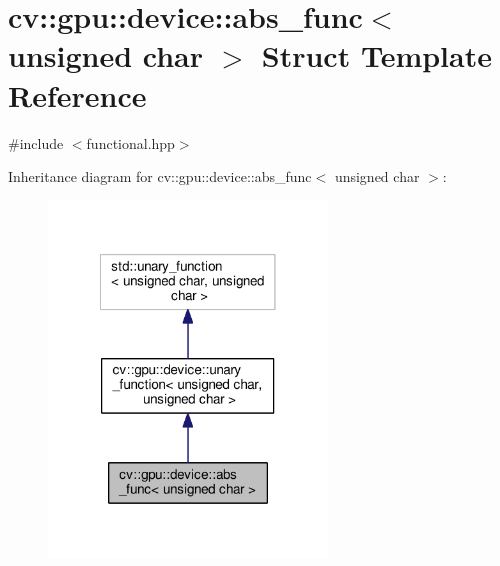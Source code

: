 \hypertarget{structcv_1_1gpu_1_1device_1_1abs__func_3_01unsigned_01char_01_4}{\section{cv\-:\-:gpu\-:\-:device\-:\-:abs\-\_\-func$<$ unsigned char $>$ Struct Template Reference}
\label{structcv_1_1gpu_1_1device_1_1abs__func_3_01unsigned_01char_01_4}
}


{\ttfamily \#include $<$functional.\-hpp$>$}



Inheritance diagram for cv\-:\-:gpu\-:\-:device\-:\-:abs\-\_\-func$<$ unsigned char $>$\-:\nopagebreak
\begin{figure}[H]
\begin{center}
\leavevmode
\includegraphics[width=210pt]{structcv_1_1gpu_1_1device_1_1abs__func_3_01unsigned_01char_01_4__inherit__graph}
\end{center}
\end{figure}


